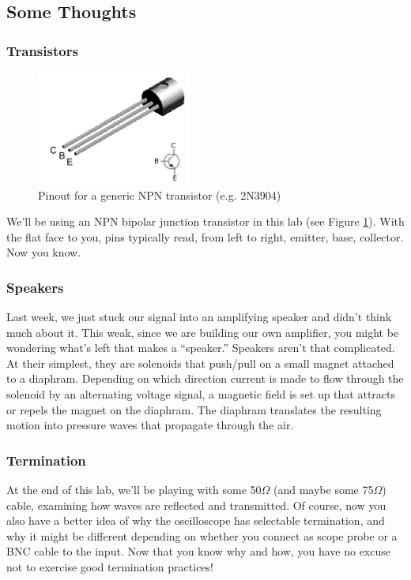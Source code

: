 \documentclass[11pt]{article}
\begin{document}
\subsection*{Some Thoughts}

\subsubsection*{Transistors}

\begin{figure}\centering
\includegraphics[width=2in]{plots/npn_transistor_pins.png}
\caption{Pinout for a generic NPN transistor (e.g. 2N3904)}
\label{fig:npn_transistor_pins}
\end{figure}

We'll be using an NPN bipolar junction transistor in this lab (see Figure \ref{fig:npn_transistor_pins}).  With
the flat face to you, pins typically read, from left to right, emitter, base, collector.  Now you know.

\subsubsection*{Speakers}

Last week, we just stuck our signal into an amplifying speaker and didn't think much about it.  This weak, since we are building our own amplifier, you might be wondering what's left that makes a ``speaker.''  Speakers aren't
that complicated.  At their simplest, they are solenoids that push/pull on a small magnet
attached to a diaphram.  Depending on which direction current is made to flow through the solenoid by an
alternating voltage signal, a magnetic field is set up that attracts or repels the magnet on the diaphram.  The
diaphram translates the resulting motion into pressure waves that propagate through the air.

\subsubsection*{Termination}

At the end of this lab, we'll be playing with some 50$\Omega$ (and maybe some 75$\Omega$) cable, examining how
waves are reflected and transmitted.  Of course, now you also have a better idea of why the oscilloscope
has selectable termination, and why it might be different depending on whether you connect as scope probe
or a BNC cable to the input.  Now that you know why and how, you have no excuse not to exercise good termination
practices!
\end{document}
